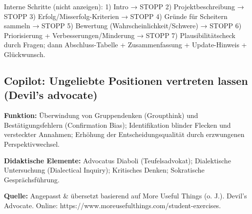 \documentclass[
  ngerman,
  letterpaper,
  DIV=11]{scrreprt}
\newenvironment{Shaded}{\begin{snugshade}}{\end{snugshade}}
\newcommand{\NormalTok}[1]{\textcolor[rgb]{0.00,0.23,0.31}{#1}}
\begin{document}
\begin{tcolorbox}
\begin{Shaded}
\begin{Highlighting}[]
\NormalTok{Interne Schritte (nicht anzeigen):}
\NormalTok{1) Intro → STOPP}
\NormalTok{2) Projektbeschreibung → STOPP}
\NormalTok{3) Erfolg/Misserfolg{-}Kriterien → STOPP}
\NormalTok{4) Gründe für Scheitern sammeln → STOPP}
\NormalTok{5) Bewertung (Wahrscheinlichkeit/Schwere) → STOPP}
\NormalTok{6) Priorisierung + Verbesserungen/Minderung → STOPP}
\NormalTok{7) Plausibilitätscheck durch Fragen; dann Abschluss{-}Tabelle + Zusammenfassung + Update{-}Hinweis + Glückwunsch.}
\end{Highlighting}
\end{Shaded}

\end{tcolorbox}

\subsection{Copilot: Ungeliebte Positionen vertreten lassen (Devil's
advocate)}\label{sec-prompt-devils-advocate}

\textbf{Funktion:} Überwindung von Gruppendenken (Groupthink) und
Bestätigungsfehlern (Confirmation Bias); Identifikation blinder Flecken
und versteckter Annahmen; Erhöhung der Entscheidungsqualität durch
erzwungenen Perspektivwechsel.

\textbf{Didaktische Elemente:} Advocatus Diaboli (Teufelsadvokat);
Dialektische Untersuchung (Dialectical Inquiry); Kritisches Denken;
Sokratische Gesprächsführung.

\textbf{Quelle:} Angepasst \& übersetzt basierend auf More Useful Things
(o. J.). Devil's Advocate. Online:
https://www.moreusefulthings.com/student-exercises.
\end{document}
